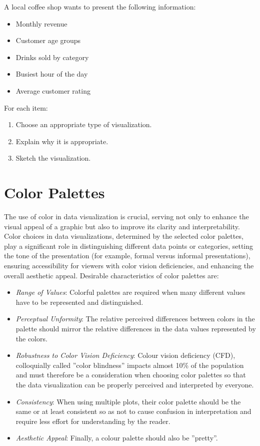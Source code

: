 \begin{exerciseboxpaper}
A local coffee shop wants to present the following information:

\begin{itemize}
\item Monthly revenue
\item Customer age groups
\item Drinks sold by category
\item Busiest hour of the day
\item Average customer rating
\end{itemize}

For each item:

\begin{enumerate}
\item Choose an appropriate type of visualization.
\item Explain why it is appropriate.
\item Sketch the visualization.
\end{enumerate}
\end{exerciseboxpaper}


\section{Color Palettes}

The use of color in data visualization is crucial, serving not only to enhance the visual appeal of a graphic but also to improve its clarity and interpretability. Color choices in data visualizations, determined by the selected color palettes, play a significant role in distinguishing different data points or categories, setting the tone of the presentation (for example, formal versus informal presentations), ensuring accessibility for viewers with color vision deficiencies, and enhancing the overall aesthetic appeal. Desirable characteristics of color palettes are:

\begin{itemize}
   \item \emph{Range of Values}: Colorful palettes are required when many different values have to be represented and distinguished.
   \item \emph{Perceptual Unformity}: The relative perceived differences between colors in the palette should mirror the relative differences in the data values represented by the colors.
   \item \emph{Robustness to Color Vision Deficiency}: Colour vision deficiency (CFD), colloquially called ''color blindness'' impacts almost 10\% of the population and must therefore be a consideration when choosing color palettes so that the data visualization can be properly perceived and interpreted by everyone.
   \item \emph{Consistency}: When using multiple plots, their color palette should be the same or at least consistent so as not to cause confusion in interpretation and require less effort for understanding by the reader.
   \item \emph{Aesthetic Appeal}: Finally, a colour palette should also be ''pretty''.
\end{itemize}

